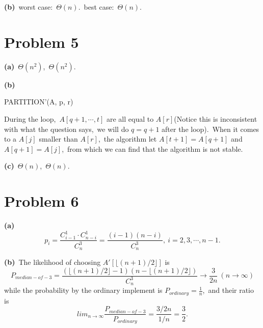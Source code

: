 \documentclass[]{article}
\begin{document}
	\textbf{(b)}\ worst case:\ $\Theta(n)$.\ best case:\ $\Theta(n)$.
	
	\section{Problem 5}
	\textbf{(a)}\ $\Theta(n^2)$,\ $\Theta(n^2)$.
	
	\textbf{(b)}
	
		\begin{algorithm}[H]
		\caption{PARTITION'(A, p, r)} %
		\begin{algorithmic}[1]
		\EndIf
		\EndIf
		\EndFor
		\end{algorithmic}
	\end{algorithm}

	During the loop,\ $A[q+1, \cdots, t]$ are all equal to $A[r]$(Notice this is inconsistent with what the question says,\ we will do $q = q+1$ after the loop).\ When it comes to a $A[j]$ smaller than $A[r]$,\ the algorithm let $A[t+1] = A[q+1]$ and $A[q+1] = A[j]$,\ from which we can find that the algorithm is not stable.
	
	\textbf{(c)}\ $\Theta(n)$,\ $\Theta(n)$.
	
	\section{Problem 6}
	\textbf{(a)}
	\begin{equation*}
	p_i = \frac{C_{i-1}^1\cdot C_{n-i}^1}{C_n^3} = \frac{(i - 1)(n - i)}{C_n^3},\ i = 2,3,\cdots,n-1.
	\end{equation*}
	
	\textbf{(b)}\ The likelihood of choosing $A'[\lfloor (n + 1)/2\rfloor ]$ is
	\begin{equation*}
	P_{median-of-3} = \frac{(\lfloor (n+1)/2\rfloor - 1)(n - \lfloor (n + 1)/2\rfloor)}{C_n^3} \to \frac{3}{2n}\ (n\to \infty)
	\end{equation*}
	while the probability by the ordinary implement is $P_{ordinary} = \frac{1}{n}$,\ and their ratio is
	\begin{equation*}
	lim_{n\to \infty}\frac{P_{median-of-3}}{P_{ordinary}} = \frac{3/2n}{1/n} = \frac{3}{2}.
	\end{equation*}
	
\end{document}
